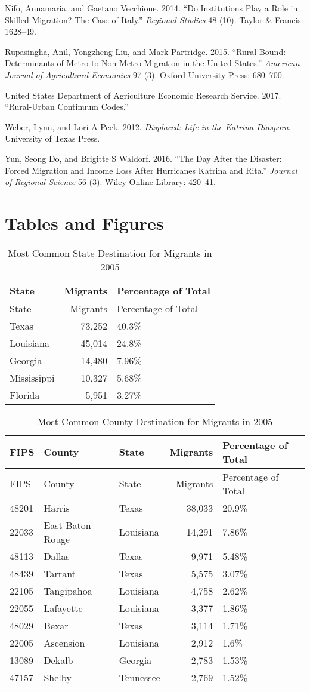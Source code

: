 \documentclass[]{article}
\begin{document}
\hypertarget{ref-nifo2014institutions}{}
Nifo, Annamaria, and Gaetano Vecchione. 2014. ``Do Institutions Play a
Role in Skilled Migration? The Case of Italy.'' \emph{Regional Studies}
48 (10). Taylor \& Francis: 1628--49.

\hypertarget{ref-rupasingha2015rural}{}
Rupasingha, Anil, Yongzheng Liu, and Mark Partridge. 2015. ``Rural
Bound: Determinants of Metro to Non-Metro Migration in the United
States.'' \emph{American Journal of Agricultural Economics} 97 (3).
Oxford University Press: 680--700.

\hypertarget{ref-ersruuc}{}
United States Department of Agriculture Economic Research Service. 2017.
``Rural-Urban Continuum Codes.''

\hypertarget{ref-weber2012displaced}{}
Weber, Lynn, and Lori A Peek. 2012. \emph{Displaced: Life in the Katrina
Diaspora}. University of Texas Press.

\hypertarget{ref-yun2016day}{}
Yun, Seong Do, and Brigitte S Waldorf. 2016. ``The Day After the
Disaster: Forced Migration and Income Loss After Hurricanes Katrina and
Rita.'' \emph{Journal of Regional Science} 56 (3). Wiley Online Library:
420--41.

\clearpage

\section{Tables and Figures}\label{tables-and-figures}

\begin{longtable}[]{@{}lrl@{}}
\caption{Most Common State Destination for Migrants in 2005
\label{tab:commondeststate}}\tabularnewline
\toprule
State & Migrants & Percentage of Total\tabularnewline
\midrule
\endfirsthead
\toprule
State & Migrants & Percentage of Total\tabularnewline
\midrule
\endhead
Texas & 73,252 & 40.3\%\tabularnewline
Louisiana & 45,014 & 24.8\%\tabularnewline
Georgia & 14,480 & 7.96\%\tabularnewline
Mississippi & 10,327 & 5.68\%\tabularnewline
Florida & 5,951 & 3.27\%\tabularnewline
\bottomrule
\end{longtable}

\clearpage

\begin{longtable}[]{@{}lllrl@{}}
\caption{Most Common County Destination for Migrants in 2005
\label{tab:commondest}}\tabularnewline
\toprule
FIPS & County & State & Migrants & Percentage of Total\tabularnewline
\midrule
\endfirsthead
\toprule
FIPS & County & State & Migrants & Percentage of Total\tabularnewline
\midrule
\endhead
48201 & Harris & Texas & 38,033 & 20.9\%\tabularnewline
22033 & East Baton Rouge & Louisiana & 14,291 & 7.86\%\tabularnewline
48113 & Dallas & Texas & 9,971 & 5.48\%\tabularnewline
48439 & Tarrant & Texas & 5,575 & 3.07\%\tabularnewline
22105 & Tangipahoa & Louisiana & 4,758 & 2.62\%\tabularnewline
22055 & Lafayette & Louisiana & 3,377 & 1.86\%\tabularnewline
48029 & Bexar & Texas & 3,114 & 1.71\%\tabularnewline
22005 & Ascension & Louisiana & 2,912 & 1.6\%\tabularnewline
13089 & Dekalb & Georgia & 2,783 & 1.53\%\tabularnewline
47157 & Shelby & Tennessee & 2,769 & 1.52\%\tabularnewline
\bottomrule
\end{longtable}
\end{document}
